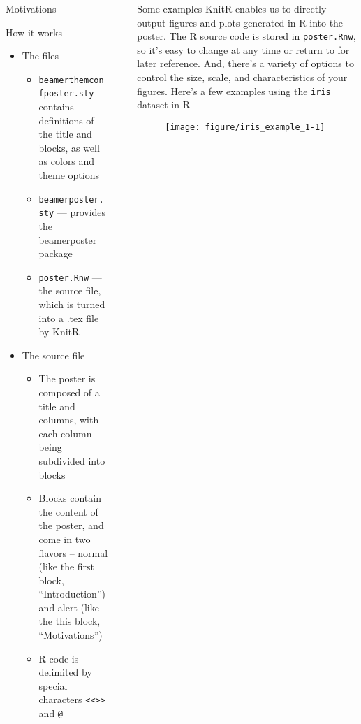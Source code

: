 \documentclass[capfont, final]{beamer}\usepackage[]{graphicx}\usepackage[]{color}
\newenvironment{knitrout}{}{} %
\newlength{\sepwid}
\newlength{\onecolwid}
\newlength{\twocolwid}
\begin{document}
\begin{frame}[t, fragile]
\begin{columns}[T]
\begin{column}{\onecolwid}
\begin{alertblock}{Motivations}
\begin{itemize}
\begin{itemize}
								\end{itemize}
						\end{itemize}
				\end{alertblock}
				\begin{block}{How it works}
						\begin{itemize}
							\item The files
								\begin{itemize}
									\item \texttt{beamerthemconfposter.sty} --- contains definitions of the title and blocks, as well as colors and theme options
									\item \texttt{beamerposter.sty} --- provides the beamerposter package
									\item \texttt{poster.Rnw} --- the source file, which is turned into a .tex file by KnitR
								\end{itemize}
							\item The source file
								\begin{itemize}
							\item The poster is composed of a title and columns, with each column being subdivided into blocks
							\item Blocks contain the content of the poster, and come in two flavors -- normal (like the first block, ``Introduction'') and alert (like the this block, ``Motivations'')
							\item R code is delimited by special characters \texttt{<<>>} and \texttt{@}
								\end{itemize}
						\end{itemize}
				\end{block}
		\end{column} %
		\begin{column}{\sepwid}\end{column} %
		\begin{column}{\twocolwid} %
				\begin{block}{Some examples}
					KnitR enables us to directly output figures and plots generated in R into the poster. The R source code is stored in \texttt{poster.Rnw}, so it's easy to change at any time or return to for later reference. And, there's a variety of options to control the size, scale, and characteristics of your figures. Here's a few examples using the \texttt{iris} dataset in R

\begin{figure}
\begin{knitrout}
\color{fgcolor}
\texttt{[image: figure/iris\_example\_1-1]} 


\end{knitrout}
\end{figure}
\end{block}
\end{column}
\end{columns}
\end{frame}
\end{document}
